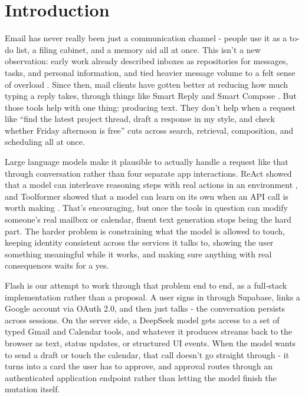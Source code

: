 \documentclass[conference]{IEEEtran}
\begin{document}
\section{Introduction}

Email has never really been just a communication channel - people use it as a to-do list, a filing cabinet, and a memory aid all at once. This isn't a new observation: early work already described inboxes as repositories for messages, tasks, and personal information, and tied heavier message volume to a felt sense of overload \cite{whittaker1996,dabbish2006}. Since then, mail clients have gotten better at reducing how much typing a reply takes, through things like Smart Reply and Smart Compose \cite{kannan2016,chen2019}. But those tools help with one thing: producing text. They don't help when a request like ``find the latest project thread, draft a response in my style, and check whether Friday afternoon is free'' cuts across search, retrieval, composition, and scheduling all at once.

Large language models make it plausible to actually handle a request like that through conversation rather than four separate app interactions. ReAct showed that a model can interleave reasoning steps with real actions in an environment \cite{yao2023}, and Toolformer showed that a model can learn on its own when an API call is worth making \cite{schick2023}. That's encouraging, but once the tools in question can modify someone's real mailbox or calendar, fluent text generation stops being the hard part. The harder problem is constraining what the model is allowed to touch, keeping identity consistent across the services it talks to, showing the user something meaningful while it works, and making sure anything with real consequences waits for a yes.

Flash is our attempt to work through that problem end to end, as a full-stack implementation rather than a proposal. A user signs in through Supabase, links a Google account via OAuth 2.0, and then just talks - the conversation persists across sessions. On the server side, a DeepSeek model gets access to a set of typed Gmail and Calendar tools, and whatever it produces streams back to the browser as text, status updates, or structured UI events. When the model wants to send a draft or touch the calendar, that call doesn't go straight through - it turns into a card the user has to approve, and approval routes through an authenticated application endpoint rather than letting the model finish the mutation itself.
\end{document}
